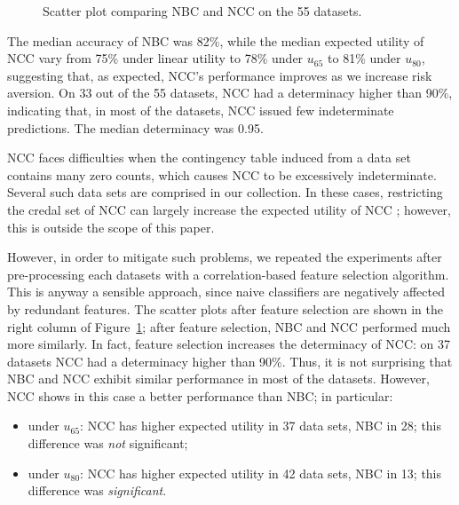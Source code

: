 \documentclass[a4paper,10pt,reqno]{amsart}
\theoremstyle{remark}
\begin{document}
\begin{figure}[!htp]
  \caption{Scatter plot comparing NBC and NCC on the 55 datasets.}
  \label{fig:nbcVSncc}
\end{figure}

The median accuracy of NBC was 82\%, while the median expected utility of NCC vary from 75\% under linear utility to 78\% under $u_{65}$ to 81\% under $u_{80}$, suggesting that, as expected, NCC's performance improves as we increase risk aversion. On 33 out of the 55 datasets, NCC had a determinacy higher than 90\%, indicating that, in most of the datasets, NCC issued few indeterminate predictions. The median determinacy was 0.95.

NCC faces difficulties when the contingency table induced from a data set contains many zero counts, which causes NCC to be excessively indeterminate. Several such data sets are comprised in our collection. In these cases, restricting the credal set of NCC can  largely increase the expected utility of NCC \cite{corani2010restricting}; however,  this is outside the scope of this paper. 

However, in order to mitigate such problems, we repeated the experiments after pre-processing each datasets with a correlation-based feature selection algorithm. 
This is anyway a sensible approach, since naive classifiers are negatively affected by redundant features.  
The scatter plots after feature selection are shown in the right column of Figure~\ref{fig:nbcVSncc};  after feature selection, NBC and NCC performed much more similarly. In fact, feature selection increases the determinacy of NCC: on 37 datasets NCC had a determinacy higher than 90\%. Thus, it is not surprising that NBC and NCC exhibit similar performance in most of the datasets.
However, NCC shows in this case a better performance than NBC; in particular:
\begin{itemize}
 \item under $u_{65}$: NCC has higher expected utility in 37 data sets, NBC in 28; this difference was \textit{not} significant;
\item  under $u_{80}$: NCC has higher expected utility in 42 data sets, NBC in 13; this difference was  \textit{significant}.
\end{itemize}
\end{document}
